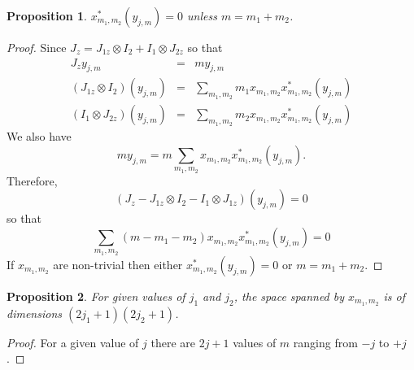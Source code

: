 \documentclass{article}
\numberwithin{equation}{section}
\theoremstyle{plain}
\numberwithin{thm}{section}
\theoremstyle{plain}
\newtheorem{prop}{Proposition}
\numberwithin{prop}{section}
\theoremstyle{definition}
\numberwithin{defn}{section}
\theoremstyle{remark}
\begin{document}
\begin{prop}\label{s10p4}
$x_{m_1,m_2}^\ast(y_{j,m}) = 0$ unless $m = m_1 + m_2$.
\end{prop}
\begin{proof}
Since $J_z = J_{1z} \otimes I_2 + I_1 \otimes J_{2z}$ so that
\begin{eqnarray}
J_z y_{j,m} &=& my_{j,m} \label{s10e29} \\
(J_{1z}\otimes I_2)(y_{j,m}) &=& \sum_{m_1,m_2}m_1x_{m_1,m_2}x_{m_1,m_2}^\ast
(y_{j,m}) \label{s10e30} \\
(I_1\otimes J_{2z})(y_{j,m}) &=& \sum_{m_1,m_2}m_2x_{m_1,m_2}x_{m_1,m_2}^\ast
(y_{j,m}) \label{s10e31}
\end{eqnarray}
We also have
\begin{equation}\label{s10e32}
my_{j,m} = m\sum_{m_1,m_2}x_{m_1,m_2}x_{m_1,m_2}^\ast(y_{j,m}).
\end{equation}
Therefore,
\begin{equation}\label{s10e33}
(J_z - J_{1z} \otimes I_2 - I_1 \otimes J_{1z})(y_{j,m}) = 0
\end{equation}
so that
\begin{equation}\label{s10e34}
\sum_{m_1,m_2}(m - m_1 - m_2)x_{m_1,m_2}x_{m_1,m_2}^\ast(y_{j,m}) = 0
\end{equation}
If $x_{m_1,m_2}$ are non-trivial then either $x_{m_1,m_2}^\ast(y_{j,m}) = 0$
or $m = m_1 + m_2$.
\end{proof}

\begin{prop}\label{s10p5}
For given values of $j_1$ and $j_2$, the space spanned by $x_{m_1,m_2}$ is
of dimensions $(2j_1 + 1)(2j_2 + 1)$.
\end{prop}
\begin{proof}
For a given value of $j$ there are $2j+1$ values of $m$ ranging from $-j$ to
$+j$.
\end{proof}
\end{document}
